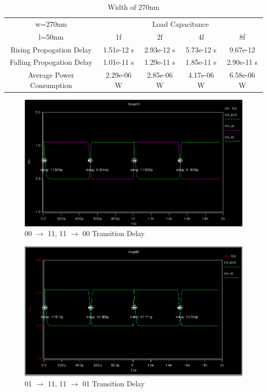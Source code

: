 \documentclass[12pt]{article}
\begin{document}
\begin{table}[H]
	\begin{center}
		\begin{tabular}{ |c|c|c|c|c| }
			\hline
			w=270nm &
			\multicolumn{4}{|c|}{Load Capacitance} \\
			\cline{2-5} l=50nm & 1f & 2f & 4f & 8f \\
			\hline
			Rising Propogation Delay & 1.51e-12 s & 2.93e-12 s & 5.73e-12 s & 9.67e-12 \\
			\hline
			Falling Propogation Delay & 1.01e-11 s& 1.29e-11 s& 1.85e-11 s& 2.90e-11 s \\
			\hline
			Average Power Consumption & 2.29e-06 W& 2.85e-06 W& 4.17e-06 W& 6.58e-06 W\\
			\hline
		\end{tabular}
	\end{center}
	\caption{Width of 270nm}
	\label{tab:3rd}
\end{table}

\begin{figure}[H]
\centering
\includegraphics[width=1\linewidth]{00_11_11_00}
\caption{00 $\to$ 11, 11 $\to$ 00 Transition Delay}
\label{fig:00_11_11_00}
\end{figure}

\begin{figure}[H]
\centering
\includegraphics[width=1\linewidth]{01_11_11_01}
\caption{01 $\to$ 11, 11 $\to$ 01 Transition Delay}
\label{fig:01_11_11_01}
\end{figure}
\end{document}
